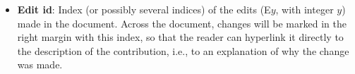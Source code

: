 {\begin{itemize}
	\item \textbf{Edit id}:
		Index (or possibly several indices) of the edits (E$y$, with integer $y$) made
	in the document.
		Across the document, changes will be marked in the right margin with this index,
	so that the reader can hyperlink it directly to the description of the contribution,
	i.e., to an explanation of why the change was made.

	\end{itemize}
	
	\clearpage
	
	{
	\setlength{\cftbeforeloctitleskip}{2em}
	\setlength{\cftsecindent}{0em}
	\setlength{\cftsecnumwidth}{0em}
	\renewcommand\cftloctitlefont{\bfseries\LARGE}
	\listofcontribution
	}


	\clearpage
	\fontsize{10}{11.2}\selectfont
	
}
	
